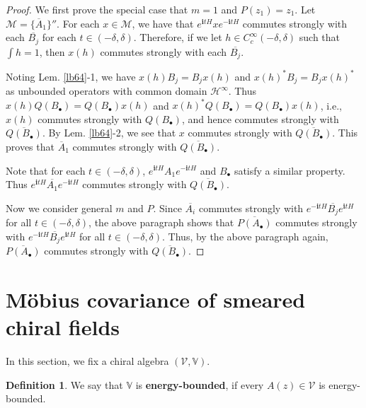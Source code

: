 \documentclass[12pt,b5paper,notitlepage]{article}
\theoremstyle{definition}
\newtheorem{df}{Definition}[section]
\theoremstyle{plain}
\newcommand{\mc}{\mathcal}
\newcommand{\ovl}{\overline}
\newcommand{\im}{\mathbf{i}}
\newcommand{\blt}{\bullet}
\newcommand{\Vbb}{\mathbb V}
\numberwithin{equation}{section}
\begin{document}
\begin{proof}
We first prove the special case that $m=1$ and $P(z_1)=z_1$. Let $\mc M=\{\ovl A_1\}''$. For each $x\in\mc M$, we have that $e^{\im tH}xe^{-\im tH}$ commutes strongly with each $\ovl{B_j}$ for each $t\in(-\delta,\delta)$. Therefore, if we let $h\in C_c^\infty(-\delta,\delta)$ such that $\int h=1$, then $x(h)$ commutes strongly with each $\ovl{B_j}$. 

Noting Lem. \ref{lb64}-1, we have $x(h)B_j=B_jx(h)$ and $x(h)^*B_j=B_jx(h)^*$ as unbounded operators with common domain $\mc H^\infty$. Thus $x(h)Q(B_\blt)=Q(B_\blt)x(h)$ and $x(h)^*Q(B_\blt)=Q(B_\blt)x(h)$, i.e., $x(h)$ commutes strongly with $Q(B_\blt)$, and hence commutes strongly with $\ovl{Q(B_\blt)}$. By Lem. \ref{lb64}-2, we see that $x$ commutes strongly with $\ovl{Q(B_\blt)}$. This proves that $\ovl A_1$ commutes strongly with $\ovl{Q(B_\blt)}$. 

Note that for each $t\in(-\delta,\delta)$, $e^{\im tH}A_1e^{-\im tH}$ and $B_\blt$ satisfy a similar property. Thus $e^{\im tH}\ovl {A_1}e^{-\im tH}$ commutes strongly with $\ovl{Q(B_\blt)}$.

Now we consider general $m$ and $P$. Since $\ovl{A_i}$ commutes strongly with $e^{-\im tH}\ovl{B_j}e^{\im tH}$ for all $t\in(-\delta,\delta)$, the above paragraph shows that $\ovl{P(A_\blt)}$ commutes strongly with $e^{-\im tH}\ovl{B_j}e^{\im tH}$ for all $t\in(-\delta,\delta)$. Thus, by the above paragraph again, $\ovl{P(A_\blt)}$ commutes strongly with $\ovl{Q(B_\blt)}$.
\end{proof}



\newpage


\section{M\"obius covariance of smeared chiral fields}


In this section, we fix a chiral algebra $(\mc V,\Vbb)$.

\begin{df}
We say that $\Vbb$ is \textbf{energy-bounded}, if every $A(z)\in\mc V$ is energy-bounded.
\end{df} 

\subsection{}
\end{document}
